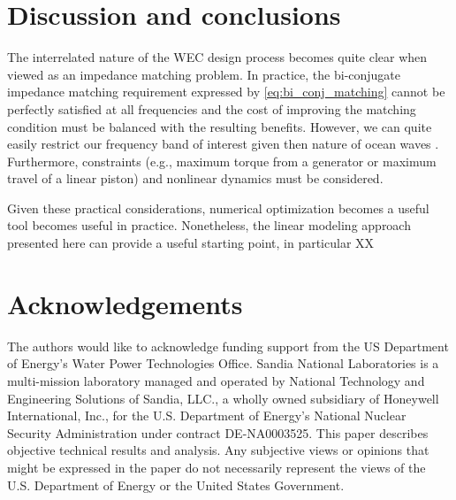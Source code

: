 \documentclass[lettersize,journal]{IEEEtran}
\begin{document}






\section{Discussion and conclusions}
The interrelated nature of the WEC design process becomes quite clear when viewed as an impedance matching problem.
In practice, the bi-conjugate impedance matching requirement expressed by \eqref{eq:bi_conj_matching} cannot be perfectly satisfied at all frequencies and the cost of improving the matching condition must be balanced with the resulting benefits.
However, we can quite easily restrict our frequency band of interest given then nature of ocean waves \cite{Coe2020a}.
Furthermore, constraints (e.g., maximum torque from a generator or maximum travel of a linear piston) and nonlinear dynamics must be considered.

Given these practical considerations, numerical optimization becomes a useful tool becomes useful in practice.
Nonetheless, the linear modeling approach presented here can provide a useful starting point, in particular XX

\section{Acknowledgements}
The authors would like to acknowledge funding support from the US Department of Energy's Water Power Technologies Office.
Sandia National Laboratories is a multi-mission laboratory managed and operated by National Technology and Engineering Solutions of Sandia, LLC., a wholly owned subsidiary of Honeywell International, Inc., for the U.S. Department of Energy's National Nuclear Security Administration under contract DE-NA0003525.
This paper describes objective technical results and analysis.
Any subjective views or opinions that might be expressed in the paper do not necessarily represent the views of the U.S. Department of Energy or the United States Government.
\end{document}
